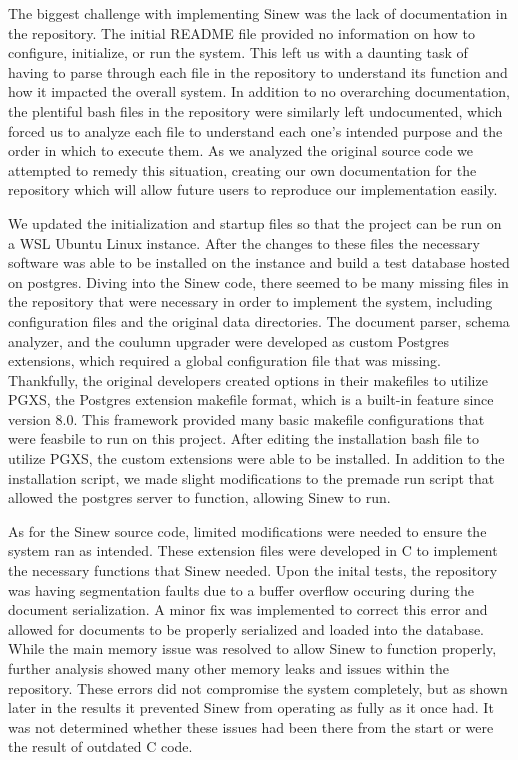\documentclass[sigconf]{acmart}
\begin{document}
    The biggest challenge with implementing Sinew was the lack of documentation in the repository. The initial README file provided no information on how to configure, initialize, or run the system. This left us with a daunting task of having to parse through each file in the repository to understand its function and how it impacted the overall system. In addition to no overarching documentation, the plentiful bash files in the repository were similarly left undocumented, which forced us to analyze each file to understand each one's intended purpose and the order in which to execute them. As we analyzed the original source code we attempted to remedy this situation, creating our own documentation for the repository which will allow future users to reproduce our implementation easily.

    We updated the initialization and startup files so that the project can be run on a WSL Ubuntu Linux instance. After the changes to these files the necessary software was able to be installed on the instance and build a test database hosted on postgres. Diving into the Sinew code, there seemed to be many missing files in the repository that were necessary in order to implement the system, including configuration files and the original data directories. The document parser, schema analyzer, and the coulumn upgrader were developed as custom Postgres extensions, which required a global configuration file that was missing. Thankfully, the original developers created options in their makefiles to utilize PGXS, the Postgres extension makefile format, which is a built-in feature since version 8.0. This framework provided many basic makefile configurations that were feasbile to run on this project. After editing the installation bash file to utilize PGXS, the custom extensions were able to be installed. In addition to the installation script, we made slight modifications to the premade run script that allowed the postgres server to function, allowing Sinew to run.

    As for the Sinew source code, limited modifications were needed to ensure the system ran as intended. These extension files were developed in C to implement the necessary functions that Sinew needed. Upon the inital tests, the repository was having segmentation faults due to a buffer overflow occuring during the document serialization. A minor fix was implemented to correct this error and allowed for documents to be properly serialized and loaded into the database. While the main memory issue was resolved to allow Sinew to function properly, further analysis showed many other memory leaks and issues within the repository. These errors did not compromise the system completely, but as shown later in the results it prevented Sinew from operating as fully as it once had. It was not determined whether these issues had been there from the start or were the result of outdated C code.
\end{document}
